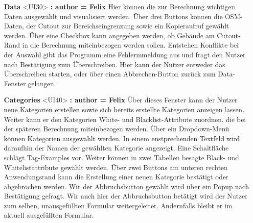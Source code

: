 \documentclass[parskip=full]{scrartcl} %
\begin{document}
\textbf{Data }<UI30>\textbf{ : author = Felix}
Hier können die zur Berechnung wichtigen Daten ausgewählt und visualisiert werden.
Über drei Buttons können die OSM-Daten, der Cutout zur Bereichseingrenzung sowie ein Kopieraufruf gewählt werden. Über eine Checkbox kann angegeben werden, ob Gebäude am Cutout-Rand in die Berechnung miteinbezogen werden sollen.
Entstehen Konflikte bei der Auswahl gibt das Programm eine Fehlermmeldung aus und fragt den Nutzer nach Bestätigung zum Überschreiben. Hier kann der Nutzer entweder das Überschreiben starten, oder über einen Abbrechen-Button zurück zum Data-Fenster gelangen.

\textbf{Categories }<UI40>\textbf{ : author = Felix}
Über dieses Fenster kann der Nutzer neue Kategorien erstellen sowie sich bereits erstellte Kategorien anzeigen lassen. Weiter kann er den Kategorien White- und Blacklist-Attribute zuordnen, die bei der späteren Berechnung miteinbezogen werden.
Über ein Dropdown-Menü können Kategorien ausgewählt werden. In einem enstprechenden Textfeld wird daraufhin der Namen der gewählten Kategorie angezeigt. Eine Schaltfläche schlägt Tag-Examples vor. Weiter können in zwei Tabellen besagte Black- und Whitelistattribute gewählt werden.
Über zwei Buttons am unteren rechten Anwendungsrand kann die Erstellung einer neuen Kategorie bestätigt oder abgebrochen werden. 
Wir der Abbruchsbutton gewählt wird über ein Popup nach Bestätigung gefragt. Wir auch hier der Abbruchsbutton betätigt wird der Nutzer zum selben, unausgefüllten Formular weitergeleitet. Andernfalls bleibt er im aktuell ausgefüllten Formular.
\end{document}
